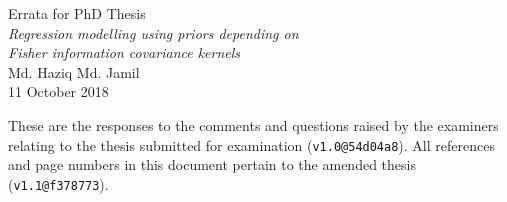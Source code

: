 \documentclass[11pt,openright,twoside]{report}
\begin{document}
\pagestyle{chaptererr}

\begin{center}
  {\Large Errata for PhD Thesis} \\[0.5em]
  \textit{\large Regression modelling using priors depending on} \\[-0.2em]
  \textit{\large Fisher information covariance kernels} \\[0.5em]
  {\large Md. Haziq Md. Jamil} \\
  {\large 11 October 2018}
\end{center}

\vspace{2em}

These are the responses to the comments and questions raised by the examiners relating to the thesis submitted for examination (\verb|v1.0@54d04a8|).
All references and page numbers in this document pertain to the amended thesis (\verb|v1.1@f378773|).
\end{document}
